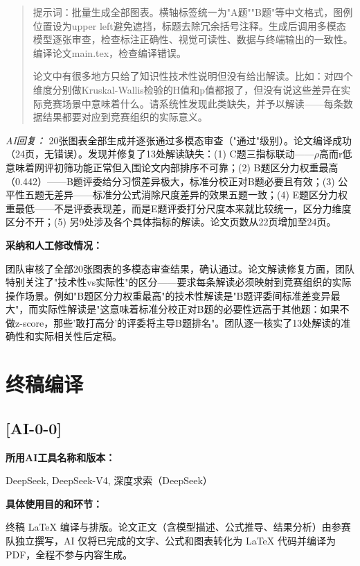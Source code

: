 \documentclass[12pt,a4paper]{ctexart}
\begin{document}
\begin{quote}
提示词：批量生成全部图表。横轴标签统一为"A题""B题"等中文格式，图例位置设为upper left避免遮挡，标题去除冗余括号注释。生成后调用多模态模型逐张审查，检查标注正确性、视觉可读性、数据与终端输出的一致性。编译论文main.tex，检查编译错误。

论文中有很多地方只给了知识性技术性说明但没有给出解读。比如：对四个维度分别做Kruskal-Wallis检验的H值和p值都报了，但没有说这些差异在实际竞赛场景中意味着什么。请系统性发现此类缺失，并予以解读——每条数据结果都要对应到竞赛组织的实际意义。
\end{quote}

\textit{AI回复：} 20张图表全部生成并逐张通过多模态审查（"通过"级别）。论文编译成功（24页，无错误）。发现并修复了13处解读缺失：(1) C题三指标联动——$\rho$高而r低意味着网评初筛功能正常但入围论文内部排序不可靠；(2) B题区分力权重最高（0.442）——B题评委给分习惯差异极大，标准分校正对B题必要且有效；(3) 公平性五题无差异——标准分公式消除尺度差异的效果五题一致；(4) E题区分力权重最低——不是评委表现差，而是E题评委打分尺度本来就比较统一，区分力维度区分不开；(5) 另9处涉及各个具体指标的解读。论文页数从22页增加至24页。

\textbf{采纳和人工修改情况：}\par
团队审核了全部20张图表的多模态审查结果，确认通过。论文解读修复方面，团队特别关注了"技术性vs实际性"的区分——要求每条解读必须映射到竞赛组织的实际操作场景。例如"B题区分力权重最高"的技术性解读是"B题评委间标准差变异最大"，而实际性解读是"这意味着标准分校正对B题的必要性远高于其他题：如果不做z-score，那些'敢打高分'的评委将主导B题排名"。团队逐一核实了13处解读的准确性和实际相关性后定稿。

\section*{终稿编译}

\subsection*{[AI-0-0]}

\textbf{所用AI工具名称和版本：}\par
DeepSeek, DeepSeek-V4, 深度求索（DeepSeek）

\textbf{具体使用目的和环节：}\par
终稿 LaTeX 编译与排版。论文正文（含模型描述、公式推导、结果分析）由参赛队独立撰写，AI 仅将已完成的文字、公式和图表转化为 LaTeX 代码并编译为 PDF，全程不参与内容生成。
\end{document}
